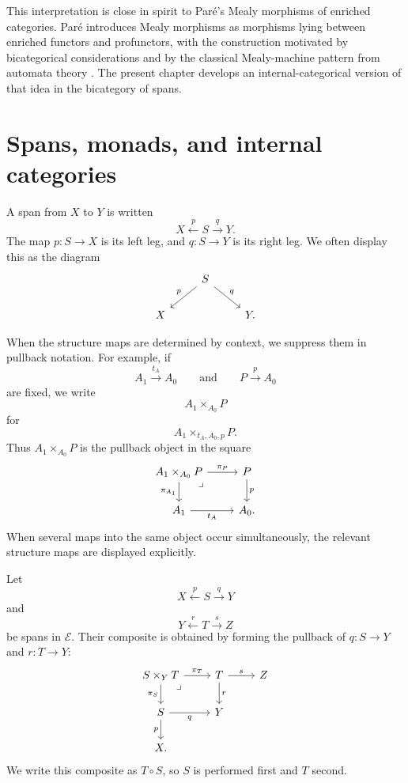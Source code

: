 This interpretation is close in spirit to Par\'e's Mealy morphisms of enriched categories. Par\'e introduces Mealy morphisms as morphisms lying between enriched functors and profunctors, with the construction motivated by bicategorical considerations and by the classical Mealy-machine pattern from automata theory \cite{PareMealyMorphisms}. The present chapter develops an internal-categorical version of that idea in the bicategory of spans.

\section{Spans, monads, and internal categories}
\label{sec:spans-monads-internal-categories}

A span from \(X\) to \(Y\) is written
\[
    X \xleftarrow{p} S \xrightarrow{q} Y.
\]
The map \(p:S\to X\) is its left leg, and \(q:S\to Y\) is its right leg. We often display this as the diagram
\[
    \begin{tikzcd}
        & 
            S 
                \arrow[dl, "p"'] 
                \arrow[dr, "q"] 
        & 
        \\
            X 
        &
        & 
            Y.
    \end{tikzcd}
\]

When the structure maps are determined by context, we suppress them in pullback notation. For example, if
\[
    A_1\xrightarrow{t_A}A_0
    \qquad\text{and}\qquad
    P\xrightarrow{p}A_0
\]
are fixed, we write
\[
    A_1\times_{A_0}P
\]
for
\[
    A_1\times_{t_A,A_0,p}P.
\]
Thus \(A_1\times_{A_0}P\) is the pullback object in the square
\[
    \begin{tikzcd}
            A_1\times_{A_0}P
                \arrow[r, "\pi_P"]
                \arrow[d, "\pi_{A_1}"']
                \arrow[dr, phantom, "\lrcorner", very near start]
        &
            P
                \arrow[d, "p"]
        \\
            A_1
                \arrow[r, "t_A"']
        &
            A_0.
    \end{tikzcd}
\]
When several maps into the same object occur simultaneously, the relevant structure maps are displayed explicitly.

Let
\[
    X \xleftarrow{p} S \xrightarrow{q} Y
\]
and
\[
    Y \xleftarrow{r} T \xrightarrow{s} Z
\]
be spans in \(\mathcal E\). Their composite is obtained by forming the pullback of \(q:S\to Y\) and \(r:T\to Y\):
\[
    \begin{tikzcd}
            S\times_Y T
                \arrow[r, "\pi_T"]
                \arrow[d, "\pi_S"']
                \arrow[dr, phantom, "\lrcorner", very near start]
        &
            T
                \arrow[r, "s"]
                \arrow[d, "r"]
        & 
            Z
        \\
            S
                \arrow[r, "q"']
                \arrow[d, "p"']
        &
            Y 
        \\
            X.
    \end{tikzcd}
\]
We write this composite as \(T\circ S\), so \(S\) is performed first and \(T\)
second.

